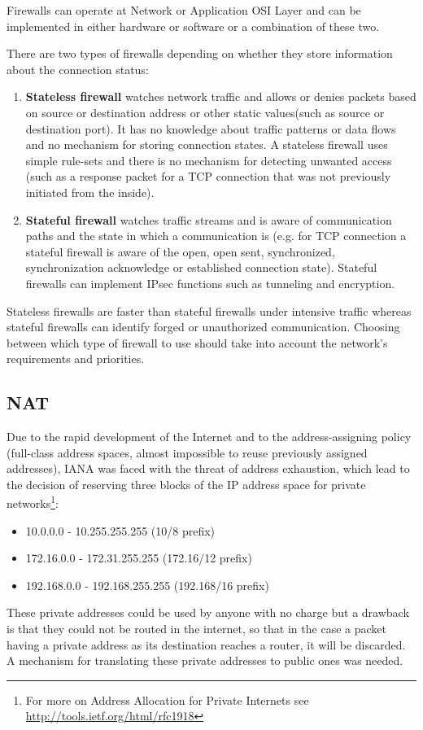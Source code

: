 Firewalls can operate at Network or Application OSI Layer and can be implemented in either hardware or software 
or a combination of these two.
 
There are two types of firewalls depending on whether they store information about the connection status:
\begin{enumerate}
\item{\textbf{Stateless firewall}} watches network traffic and  allows or denies packets based on source or 
destination address or other static values(such as source or destination port). It has no knowledge about 
traffic patterns or data flows and no mechanism for storing connection states. A stateless firewall uses 
simple rule-sets and there is no mechanism for detecting unwanted access (such as a response packet for a 
TCP connection that was not previously initiated from the inside).
\item{\textbf{Stateful firewall}} watches traffic streams and is aware of communication paths and the state 
in which a communication is (e.g. for TCP connection a stateful firewall is aware of the open, open sent, 
synchronized, synchronization acknowledge or established connection state). Stateful firewalls can implement 
IPsec functions such as tunneling and encryption.
\end{enumerate}
Stateless firewalls are faster than stateful firewalls under intensive traffic whereas stateful firewalls can 
identify forged or unauthorized communication. Choosing between which type of firewall to use should take into 
account the network's requirements and priorities.  

\subsection{NAT}
\label{sub-sec:nat}
Due to the rapid development of the Internet and to the address-assigning policy (full-class address spaces, almost impossible to reuse previously assigned addresses), IANA was faced with the threat of address exhaustion, which lead to the decision of reserving three blocks of the IP address space for private networks\footnote{For more on Address Allocation for Private Internets see \url{http://tools.ietf.org/html/rfc1918}}:
\begin{itemize}
\item10.0.0.0        -   10.255.255.255  (10/8 prefix)
\item172.16.0.0      -   172.31.255.255  (172.16/12 prefix)
\item192.168.0.0     -   192.168.255.255 (192.168/16 prefix)
\end{itemize}
These private addresses could be used by anyone with no charge but a drawback is that they could not be routed 
in the internet, so that in the case a packet having a private address as its destination reaches a router, it 
will be discarded. A mechanism for translating these private addresses to public ones was needed.

